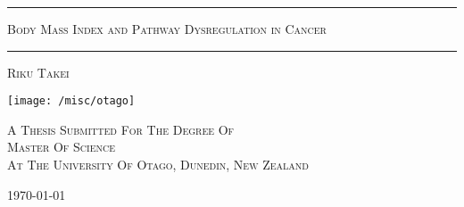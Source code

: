 \begin{titlepage}

\centering

\rule[2.0mm]{\textwidth}{0.5mm}

\begin{doublespace}
    {\Huge \scshape Body Mass Index and Pathway Dysregulation in Cancer}
\end{doublespace}

\rule[2.0mm]{\textwidth}{0.5mm}

\vspace{2.0mm}
{\Large \scshape Riku Takei}

\vfill

\vspace{3cm}

\texttt{[image: /misc/otago]}

\vfill

{\normalsize \scshape A Thesis Submitted For The Degree Of\\}
{\Large \scshape Master Of Science\\}
\vspace{2.0mm}
{\normalsize \scshape At The University Of Otago, Dunedin, New Zealand \\}

\vspace{10.0mm}
{\normalsize \scshape \today}

\end{titlepage}
